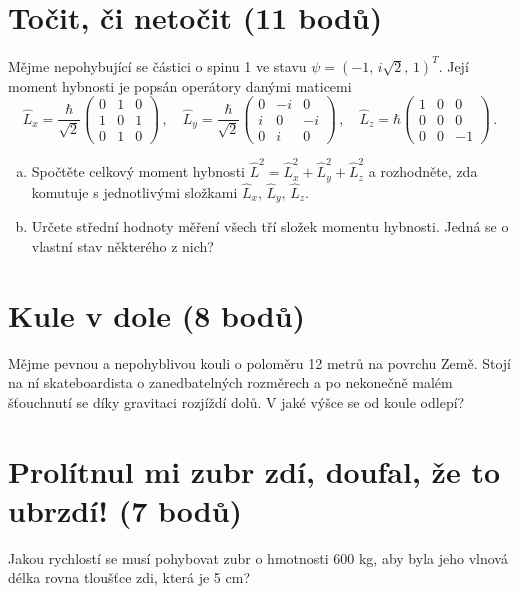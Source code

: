 \documentclass[10pt,a4paper,landscape]{article}
\begin{document}
\begin{multicols}{2}[]
\section{Točit, či netočit (11 bodů)}
Mějme nepohybující se částici o spinu 1 ve stavu $\psi = \left(-1,\, i\sqrt{2},\, 1\right)^T$. Její moment hybnosti je popsán operátory danými maticemi
\begin{equation}
\hat{L}_x = \frac{\hbar}{\sqrt{2}}\begin{pmatrix}0 & 1 & 0\\ 1 & 0 & 1\\ 0 & 1 & 0\end{pmatrix} \,,\quad
\hat{L}_y = \frac{\hbar}{\sqrt{2}}\begin{pmatrix}0 &-i & 0\\ i & 0 &-i\\ 0 & i & 0\end{pmatrix} \,,\quad
\hat{L}_z =       \hbar           \begin{pmatrix}1 & 0 & 0\\ 0 & 0 & 0\\ 0 & 0 &-1\end{pmatrix} \,.
\end{equation}
\begin{enumerate}[a)]
\item Spočtěte celkový moment hybnosti $\hat{L}^2 = \hat{L}_x^2 + \hat{L}_y^2 + \hat{L}_z^2$ a rozhodněte, zda komutuje s jednotlivými složkami $\hat{L}_x,\,\hat{L}_y,\,\hat{L}_z$.
\item Určete střední hodnoty měření všech tří složek momentu hybnosti. Jedná se o vlastní stav některého z nich?
\end{enumerate}

\section{Kule v dole (8 bodů)}
Mějme pevnou a nepohyblivou kouli o poloměru 12 metrů na povrchu Země. Stojí na ní skateboardista o zanedbatelných rozměrech a po nekonečně malém šťouchnutí se díky gravitaci rozjíždí dolů. V jaké výšce se od koule odlepí?

\section{Prolítnul mi zubr zdí, doufal, že to ubrzdí! (7 bodů)}
Jakou rychlostí se musí pohybovat zubr o hmotnosti 600 kg, aby byla jeho vlnová délka rovna tloušťce zdi, která je 5 cm?


\end{multicols}
\end{document}
